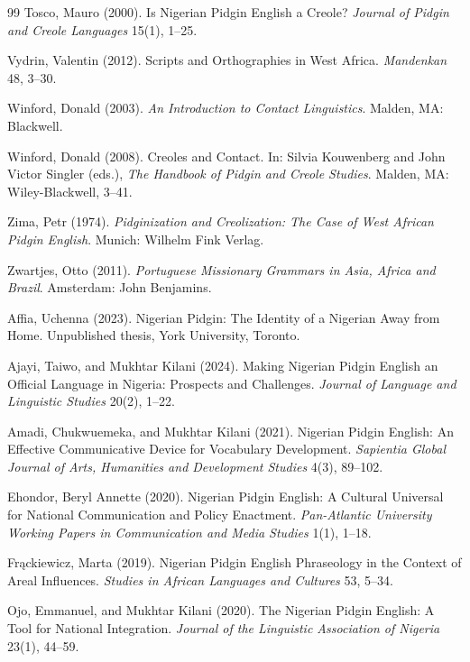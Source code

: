 \documentclass[12pt]{article}
\begin{document}
\begin{thebibliography}{99}
Tosco, Mauro (2000).
Is Nigerian Pidgin English a Creole?
\textit{Journal of Pidgin and Creole Languages} 15(1), 1--25.

Vydrin, Valentin (2012).
Scripts and Orthographies in West Africa.
\textit{Mandenkan} 48, 3--30.

Winford, Donald (2003).
\textit{An Introduction to Contact Linguistics}.
Malden, MA: Blackwell.

Winford, Donald (2008).
Creoles and Contact.
In: Silvia Kouwenberg and John Victor Singler (eds.),
\textit{The Handbook of Pidgin and Creole Studies}.
Malden, MA: Wiley-Blackwell, 3--41.

Zima, Petr (1974).
\textit{Pidginization and Creolization: The Case of West African Pidgin English}.
Munich: Wilhelm Fink Verlag.

Zwartjes, Otto (2011).
\textit{Portuguese Missionary Grammars in Asia, Africa and Brazil}.
Amsterdam: John Benjamins.

Affia, Uchenna (2023).
Nigerian Pidgin: The Identity of a Nigerian Away from Home.
Unpublished thesis, York University, Toronto.

Ajayi, Taiwo, and Mukhtar Kilani (2024).
Making Nigerian Pidgin English an Official Language in Nigeria: Prospects and Challenges.
\textit{Journal of Language and Linguistic Studies} 20(2), 1--22.

Amadi, Chukwuemeka, and Mukhtar Kilani (2021).
Nigerian Pidgin English: An Effective Communicative Device for Vocabulary Development.
\textit{Sapientia Global Journal of Arts, Humanities and Development Studies} 4(3), 89--102.

Ehondor, Beryl Annette (2020).
Nigerian Pidgin English: A Cultural Universal for National Communication and Policy Enactment.
\textit{Pan-Atlantic University Working Papers in Communication and Media Studies} 1(1), 1--18.

Fr\k{a}ckiewicz, Marta (2019).
Nigerian Pidgin English Phraseology in the Context of Areal Influences.
\textit{Studies in African Languages and Cultures} 53, 5--34.

Ojo, Emmanuel, and Mukhtar Kilani (2020).
The Nigerian Pidgin English: A Tool for National Integration.
\textit{Journal of the Linguistic Association of Nigeria} 23(1), 44--59.

\end{thebibliography}
\end{document}
